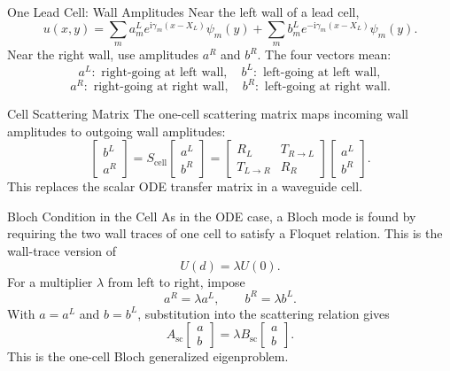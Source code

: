 \documentclass[aspectratio=169]{beamer}
\newcommand{\ii}{\mathrm{i}}
\begin{document}
\begin{frame}{One Lead Cell: Wall Amplitudes}
  Near the left wall of a lead cell,
  \[
    u(x,y)
    =
    \sum_m a_m^L e^{\ii\gamma_m(x-X_L)}\psi_m(y)
    +
    \sum_m b_m^L e^{-\ii\gamma_m(x-X_L)}\psi_m(y).
  \]
  Near the right wall, use amplitudes \(a^R\) and \(b^R\).
  The four vectors mean:
  \[
    a^L:\text{ right-going at left wall},\quad
    b^L:\text{ left-going at left wall},
  \]
  \[
    a^R:\text{ right-going at right wall},\quad
    b^R:\text{ left-going at right wall}.
  \]
\end{frame}

\begin{frame}{Cell Scattering Matrix}
  The one-cell scattering matrix maps incoming wall amplitudes to outgoing wall amplitudes:
  \[
    \begin{bmatrix} b^L\\ a^R \end{bmatrix}
    =
    S_{\mathrm{cell}}
    \begin{bmatrix} a^L\\ b^R \end{bmatrix}
    =
    \begin{bmatrix}
      R_L & T_{R\to L}\\
      T_{L\to R} & R_R
    \end{bmatrix}
    \begin{bmatrix} a^L\\ b^R \end{bmatrix}.
  \]
  This replaces the scalar ODE transfer matrix in a waveguide cell.
\end{frame}

\begin{frame}{Bloch Condition in the Cell}
  As in the ODE case, a Bloch mode is found by requiring the two wall traces of one cell to satisfy a Floquet relation.
  This is the wall-trace version of
  \[
    U(d)=\lambda U(0).
  \]
  For a multiplier \(\lambda\) from left to right, impose
  \[
    a^R=\lambda a^L,
    \qquad
    b^R=\lambda b^L.
  \]
  With \(a=a^L\) and \(b=b^L\), substitution into the scattering relation gives
  \[
    A_{\mathrm{sc}}
    \begin{bmatrix}a\\b\end{bmatrix}
    =
    \lambda B_{\mathrm{sc}}
    \begin{bmatrix}a\\b\end{bmatrix}.
  \]
  This is the one-cell Bloch generalized eigenproblem.
\end{frame}
\end{document}
